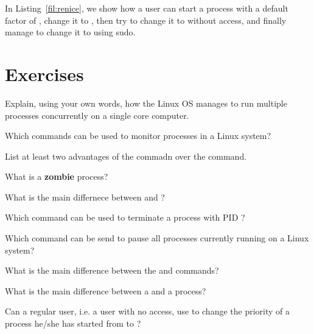 In Listing~\ref{fil:renice}, we show how a user can start a process with a default  factor of , change it to , then try to change it to  without  access, and finally manage to change it to  using sudo.


\newpage

\section*{Exercises}

\begin{exercises}
  \item Explain, using your own words, how the Linux \acs{OS} manages to run multiple processes concurrently on a single core computer.
  \item Which commands can be used to monitor processes in a Linux system?
  \item List at least two advantages of the  commadn over the  command.
  \item What is a \textbf{zombie} process?
  \item What is the main differnece between   and ?
  \item Which command can be used to terminate a process with PID ?
  \item Which command can be send to pause all  processes currently running on a Linux system?
  \item What is the main difference between the  and  commands?
  \item What is the main difference between a  and a  process? 
  \item Can a regular user, i.e. a user with no  access, use  to change the priority of a process he/she has started from  to ?

\end{exercises}